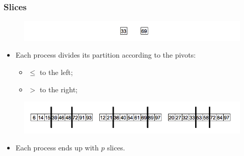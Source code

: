 \documentclass{beamer}
\begin{document}
\begin{frame}
	\frametitle{Slices}
	\begin{figure}
		\begin{center}
			\includegraphics[width=\textwidth]{images/05pivots.png}
		\end{center}
	\end{figure}
	
	\pause
	\begin{itemize}
		\item{Each process divides its partition according to the pivots:
		\begin{itemize}
			\item{$\leq$ to the left;}
			\item{$>$ to the right;}
		\end{itemize}
		}
	\end{itemize}
	
	\begin{figure}
		\begin{center}
			\includegraphics[width=\textwidth]{images/06slices.png}
		\end{center}
	\end{figure}
	
	\pause
	\begin{itemize}
		\item{Each process ends up with $p$ slices.}
	\end{itemize}
\end{frame}
\end{document}
